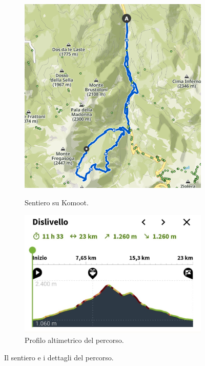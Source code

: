 \documentclass{article}
\begin{document}
\begin{figure}[htbp!]
    \begin{subfigure}[t]{0.45\textwidth}
        \centering
        \vspace{0pt} %
        \includegraphics[width=\textwidth]{images/sentiero_komoot.png}
        \caption{Sentiero su Komoot.}
        \label{fig:foto_corta1}
        \vspace{1em} %
        \includegraphics[width=\textwidth]{images/profilo_altimetrico.jpg}
        \caption{Profilo altimetrico del percorso.}
        \label{fig:foto_corta2}
    \end{subfigure}
    \caption{Il sentiero e i dettagli del percorso.}
    \label{fig:panoramica_dettagli}
\end{figure}
\end{document}
